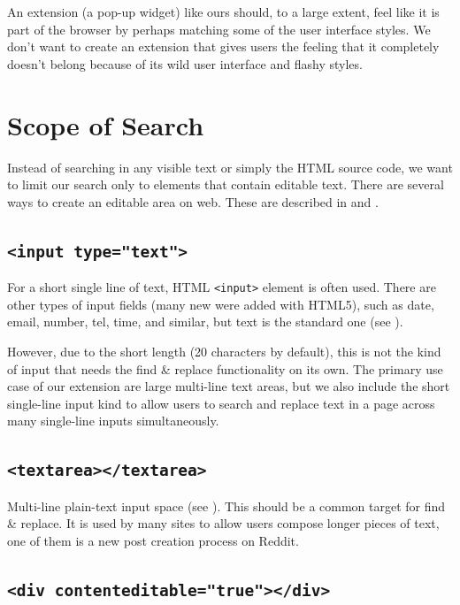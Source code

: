 \documentclass[bsc,frontabs,twoside,singlespacing,parskip,deptreport]{infthesis}
\begin{document}
An extension (a pop-up widget) like ours should, to a large extent, feel like it is part of the browser by perhaps matching some of the user interface styles. We don't want to create an extension that gives users the feeling that it completely doesn't belong because of its wild user interface and flashy styles.

\section{Scope of Search}
Instead of searching in any visible text or simply the HTML source code, we want to limit our search only to elements that contain editable text. There are several ways to create an editable area on web. These are described in \cite{M1} and \cite{P1}.

\subsection{\texttt{\textless{}input\ type="text"\textgreater{}}}

For a short single line of text, HTML
\texttt{\textless{}input\textgreater{}} element is often used. There are
other types of input fields (many new were added with HTML5), such as
date, email, number, tel, time, and similar, but text is the standard
one (see \cite{M2}).

However, due to the short length (20 characters by default), this is not the kind of input that needs the find \& replace functionality on its own. The primary use case of our extension are large multi-line text areas, but we also include the short single-line input kind to allow users to search and replace text in a page across many single-line inputs simultaneously.

\subsection{\texttt{\textless{}textarea\textgreater{}\textless{}/textarea\textgreater{}}}

Multi-line plain-text input space (see \cite{M3}). This should be a common target for find \& replace. It is used by many sites to allow users compose longer pieces of text, one of them is a new post creation process on Reddit.

\subsection{\texttt{\textless{}div\ contenteditable="true"\textgreater{}\textless{}/div\textgreater{}}}
\end{document}
